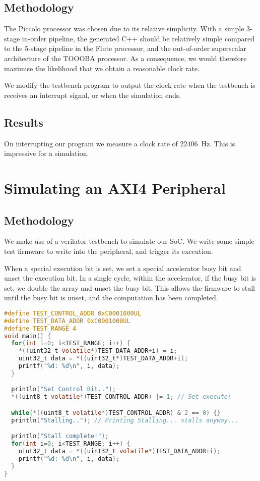 \documentclass[a4paper,8pt]{report}
\begin{document}
\subsection{Methodology}
The Piccolo processor was chosen due to its relative simplicity. With a simple
3-stage in-order pipeline, the generated C++ should be relatively simple
compared to the 5-stage pipeline in the Flute processor, and the out-of-order
superscalar architecture of the TOOOBA processor. As a consequence, we would
therefore maximise the likelihood that we obtain a reasonable clock rate.

We modify the testbench program to output the clock rate when the testbench is
receives an interrupt signal, or when the simulation ends. 

\subsection{Results}
On interrupting our program we measure a clock rate of $22406$~Hz. This is impressive for a simulation.

\section{Simulating an AXI4 Peripheral}
\subsection{Methodology}
We make use of a verilator testbench to simulate our SoC. We write some simple
test firmware to write into the peripheral, and trigger its execution.

When a special execution bit is set, we set a special accelerator busy bit and
unset the execution bit. In a single cycle, within the accelerator, if the
busy bit is set, we double the array and unset the busy bit. This allows the
firmware to stall until the busy bit is unset, and the computation has been
completed.

\begin{lstlisting}[language=C,style=customc]
#define TEST_CONTROL_ADDR 0xC0001000UL
#define TEST_DATA_ADDR 0xC0001008UL
#define TEST_RANGE 4
void main() {
  for(int i=0; i<TEST_RANGE; i++) {
    *((uint32_t volatile*)TEST_DATA_ADDR+i) = i;
    uint32_t data = *((uint32_t*)TEST_DATA_ADDR+i);
    printf("%d: %d\n", i, data);
  }

  println("Set Control Bit..");
  *((uint8_t volatile*)TEST_CONTROL_ADDR) |= 1; // Set execute!

  while(*((uint8_t volatile*)TEST_CONTROL_ADDR) & 2 == 0) {}
  println("Stalling.."); // Printing Stalling... stalls anyway...

  println("Stall complete!");
  for(int i=0; i<TEST_RANGE; i++) {
    uint32_t data = *((uint32_t volatile*)TEST_DATA_ADDR+i);
    printf("%d: %d\n", i, data);
  }
}
\end{lstlisting}
\end{document}
